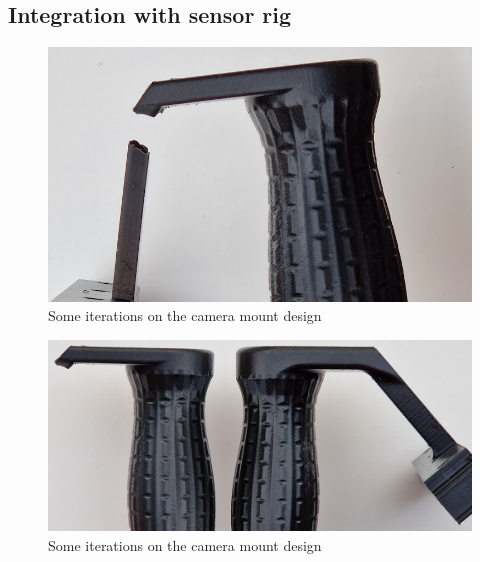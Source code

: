 \subsection{Integration with sensor rig}

\begin{figure}[H]
    \centering
    \includegraphics[width=\textwidth]{figures/3d_print/break.png}
    \caption{Some iterations on the camera mount design}
    \label{fig:hancle_break}
\end{figure}

\begin{figure}[H]
    \centering
    \includegraphics[width=\textwidth]{figures/3d_print/thickness.png}
    \caption{Some iterations on the camera mount design}
    \label{fig:handle_thickness}
\end{figure}